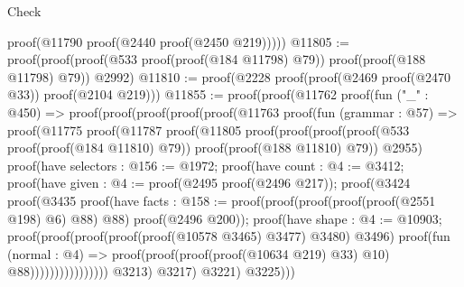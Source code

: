 \begin{lexlean}{Check}
\begin{coremodule}
          proof(@11790 proof(@2440 proof(@2450 @219)))))
@11805 := proof(proof(proof(@533 proof(proof(@184 @11798) @79)) proof(proof(@188 @11798) @79))
      @2992)
@11810 := proof(@2228 proof(proof(@2469 proof(@2470 @33)) proof(@2104 @219)))
@11855 := proof(proof(@11762
        proof(fun ("_" : @450) =>
          proof(proof(proof(proof(proof(@11763
                      proof(fun (grammar : @57) =>
                        proof(@11775
                            proof(@11787
                                proof(@11805
                                    proof(proof(proof(proof(@533 proof(proof(@184 @11810) @79))
                                            proof(proof(@188 @11810) @79))
                                          @2955)
                                        proof(have selectors : @156 := @1972;
                                          proof(have count : @4 := @3412;
                                            proof(have given : @4 := proof(@2495 proof(@2496 @217));
                                              proof(@3424
                                                  proof(@3435
                                                      proof(have facts : @158 := proof(proof(proof(proof(proof(@2551
                                                                    @198)
                                                                  @6)
                                                                @88)
                                                              @88)
                                                            proof(@2496 @200));
                                                        proof(have shape : @4 := @10903;
                                                          proof(proof(proof(proof(proof(@10578
                                                                      @3465)
                                                                    @3477)
                                                                  @3480)
                                                                @3496)
                                                              proof(fun (normal : @4) =>
                                                                proof(proof(proof(proof(@10634 @219)
                                                                        @33)
                                                                      @10)
                                                                    @88))))))))))))))))
                    @3213)
                  @3217)
                @3221)
              @3225)))

\end{coremodule}
\end{lexlean}
